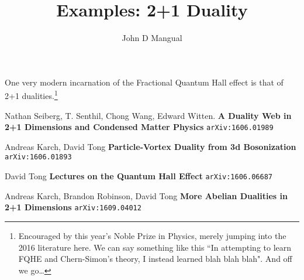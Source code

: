\documentclass[12pt]{article}
\title{\textbf{ Examples: 2+1 Duality}}
\author{John D Mangual}
\date{}
\begin{document}
\selectfont \fontsize{25}{30}\selectfont

\maketitle

\selectfont \fontsize{12}{10}\selectfont

\noindent One very modern incarnation of the Fractional Quantum Hall effect is that of 2+1 dualities.\footnote{Encouraged by this year's Noble Prize in Physics, merely jumping into the 2016 literature here.  We can say something like this ``In attempting to learn FQHE and Chern-Simon's theory, I instead learned blah blah blah".  And off we go\dots}

\newpage

\selectfont \fontsize{12}{10}\selectfont

\begin{thebibliography}{}

\item Nathan Seiberg, T. Senthil, Chong Wang, Edward Witten. \textbf{A Duality Web in 2+1 Dimensions and Condensed Matter Physics} \texttt{arXiv:1606.01989}

\item Andreas Karch, David Tong
 \textbf{Particle-Vortex Duality from 3d Bosonization} \texttt{arXiv:1606.01893}

\item David Tong \textbf{Lectures on the Quantum Hall Effect} \texttt{arXiv:1606.06687}

\item Andreas Karch, Brandon Robinson, David Tong \textbf{More Abelian Dualities in 2+1 Dimensions} \texttt{arXiv:1609.04012}

\end{thebibliography}
\end{document}
